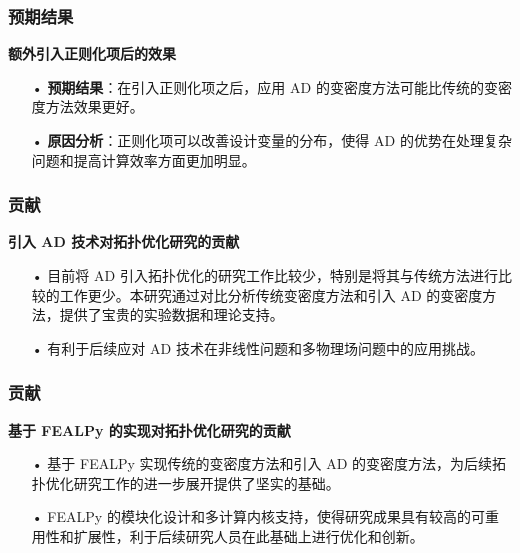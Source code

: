 \documentclass{beamer}
\numberwithin{subsection}{section}
\begin{document}
\begin{frame}
    \frametitle{预期结果}
    \textbf{额外引入正则化项后的效果}
    \begin{itemize}
        \item[•]\textbf{预期结果}：在引入正则化项之后，应用 AD 的变密度方法可能比传统的变密度方法效果更好。
        \vspace{0.3cm}
        \item[•]\textbf{原因分析}：正则化项可以改善设计变量的分布，使得 AD 的优势在处理复杂问题和提高计算效率方面更加明显。
    \end{itemize}
\end{frame}

\begin{frame}
    \frametitle{贡献}
    \textbf{引入 AD 技术对拓扑优化研究的贡献}
    \begin{itemize}
        \item[•]目前将 AD 引入拓扑优化的研究工作比较少，特别是将其与传统方法进行比较的工作更少。本研究通过对比分析传统变密度方法和引入 AD 的变密度方法，提供了宝贵的实验数据和理论支持。
        \vspace{0.3cm}
        \item[•]有利于后续应对 AD 技术在非线性问题和多物理场问题中的应用挑战。
    \end{itemize}
\end{frame}

\begin{frame}
    \frametitle{贡献}
    \textbf{基于 FEALPy 的实现对拓扑优化研究的贡献}
    \begin{itemize}
        \item[•]基于 FEALPy 实现传统的变密度方法和引入 AD 的变密度方法，为后续拓扑优化研究工作的进一步展开提供了坚实的基础。
        \vspace{0.3cm}
        \item[•]FEALPy 的模块化设计和多计算内核支持，使得研究成果具有较高的可重用性和扩展性，利于后续研究人员在此基础上进行优化和创新。
    \end{itemize}
\end{frame}
\end{document}
